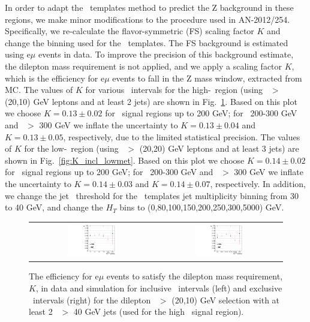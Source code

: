 In order to adapt the \MET\ templates method to predict the Z background in these regions, we make minor modifications
to the procedure used in AN-2012/254. Specifically, we re-calculate
the flavor-symmetric (FS) scaling factor $K$ and change the binning used for the \MET\ templates.
The FS background is estimated using e$\mu$ events in data.
To improve the precision of this background estimate, the dilepton mass requirement is not applied, and we apply a scaling
factor $K$, which is the efficiency for e$\mu$ events to fall in the Z mass window,  extracted from MC.
The values of $K$ for various \MET\ intervals for the high-\MET\ region (using \pt\ $>$ (20,10) GeV leptons and at least 2 jets) 
are shown in Fig.~\ref{fig:K_incl_highmet}. 
Based on this plot we choose $K=0.13\pm0.02$ for \MET\ signal regions up to 200 GeV; for \MET\ 200-300 GeV and \MET\ $>$ 300 GeV
we inflate the uncertainty to $K=0.13\pm0.04$ and $K=0.13\pm0.05$, respectively, due to the limited statistical precision.
The values of $K$ for the low-\MET\ region (using \pt\ $>$ (20,20) GeV leptons and at least 3 jets) are shown in 
Fig.~\ref{fig:K_incl_lowmet}. 
Based on this plot we choose $K=0.14\pm0.02$ for \MET\ signal regions up to 200 GeV; for \MET\ 200-300 GeV and \MET\ $>$ 300 GeV
we inflate the uncertainty to $K=0.14\pm0.03$ and $K=0.14\pm0.07$, respectively. In addition, we change the 
jet \pt\ threshold for the \MET\ templates jet multiplicity binning from 30 to 40 GeV, and change the $H_T$ bins to
(0,80,100,150,200,250,300,5000) GeV.

\begin{figure}[!ht]
\begin{center}
\begin{tabular}{cc}
\includegraphics[width=0.4\textwidth]{plots/extractK_inclusive_pt2010_92fb.pdf} &
\includegraphics[width=0.4\textwidth]{plots/extractK_exclusive_pt2010_92fb.pdf} \\
\end{tabular}
\caption{\label{fig:K_incl_highmet}
The efficiency for e$\mu$ events to satisfy the dilepton mass requirement, $K$, in data and simulation for inclusive \MET\ intervals 
(left) and exclusive \MET\ intervals (right) for the dilepton \pt\ $>$ (20,10) GeV selection with at least 2 \pt\ $>$ 40 GeV jets
(used for the high \MET\ signal region). 
}
\end{center}
\end{figure}

